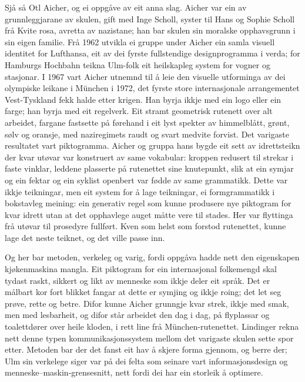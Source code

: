 Sjå så Otl Aicher, og ei oppgåve av eit anna slag. Aicher var ein av grunnleggjarane av skulen, gift med Inge Scholl, syster til Hans og Sophie Scholl frå Kvite rosa, avretta av nazistane; han bar skulen sin moralske opphavsgrunn i sin eigen familie. Frå 1962 utvikla ei gruppe under Aicher ein samla visuell identitet for Lufthansa, eit av dei fyrste fullstendige designprogramma i verda; for Hamburgs Hochbahn teikna Ulm-folk eit heilskapleg system for vogner og stasjonar. I 1967 vart Aicher utnemnd til å leie den visuelle utforminga av dei olympiske leikane i München i 1972, det fyrste store internasjonale arrangementet Vest-Tyskland fekk halde etter krigen. Han byrja ikkje med ein logo eller ein farge; han byrja med eit regelverk. Eit stramt geometrisk rutenett over alt arbeidet, fargane fastsette på førehand i eit lyst spekter av himmelblått, grønt, sølv og oransje, med naziregimets raudt og svart medvite forvist. Det varigaste resultatet vart piktogramma. Aicher og gruppa hans bygde eit sett av idrettsteikn der kvar utøvar var konstruert av same vokabular: kroppen redusert til strekar i faste vinklar, leddene plasserte på rutenettet sine knutepunkt, slik at ein symjar og ein fektar og ein syklist openbert var fødde av same grammatikk. Dette var ikkje teikningar, men eit system for å lage teikningar, ei formgrammatikk i bokstavleg meining: ein generativ regel som kunne produsere nye piktogram for kvar idrett utan at det opphavlege auget måtte vere til stades. Her var flyttinga frå utøvar til prosedyre fullført. Kven som helst som forstod rutenettet, kunne lage det neste teiknet, og det ville passe inn.

Og her bar metoden, verkeleg og varig, fordi oppgåva hadde nett den eigenskapen kjøkenmaskina mangla. Eit piktogram for ein internasjonal folkemengd skal tydast raskt, sikkert og likt av menneske som ikkje deler eit språk. Det er målbart kor fort blikket fangar at dette er symjing og ikkje roing; det let seg prøve, rette og betre. Difor kunne Aicher grunngje kvar strek, ikkje med smak, men med lesbarheit, og difor står arbeidet den dag i dag, på flyplassar og toalettdører over heile kloden, i rett line frå München-rutenettet. Lindinger rekna nett denne typen kommunikasjonssystem mellom det varigaste skulen sette spor etter\autocite{lindinger1991ulm}. Metoden bar der det fanst eit hav å skjere forma gjennom, og berre der; Ulm sin verkelege siger var på dei felta som seinare vart informasjonsdesign og menneske–maskin-grensesnitt, nett fordi dei har ein storleik å optimere.

